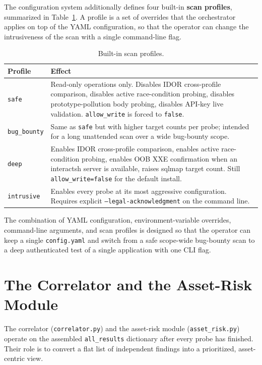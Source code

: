 The configuration system additionally defines four built-in \textbf{scan profiles}, summarized in Table~\ref{tab:profiles}. A profile is a set of overrides that the orchestrator applies on top of the YAML configuration, so that the operator can change the intrusiveness of the scan with a single command-line flag.

\begin{table}[h]
\centering
\small
\begin{tabular}{|l|p{10cm}|}
\hline
\textbf{Profile} & \textbf{Effect} \\
\hline
\texttt{safe}       & Read-only operations only. Disables IDOR cross-profile comparison, disables active race-condition probing, disables prototype-pollution body probing, disables API-key live validation. \texttt{allow\_write} is forced to \texttt{false}. \\
\texttt{bug\_bounty}& Same as \texttt{safe} but with higher target counts per probe; intended for a long unattended scan over a wide bug-bounty scope. \\
\texttt{deep}       & Enables IDOR cross-profile comparison, enables active race-condition probing, enables OOB XXE confirmation when an interactsh server is available, raises sqlmap target count. Still \texttt{allow\_write=false} for the default install. \\
\texttt{intrusive}  & Enables every probe at its most aggressive configuration. Requires explicit \texttt{--legal-acknowledgment} on the command line. \\
\hline
\end{tabular}
\caption{Built-in scan profiles.}
\label{tab:profiles}
\end{table}

The combination of YAML configuration, environment-variable overrides, command-line arguments, and scan profiles is designed so that the operator can keep a single \texttt{config.yaml} and switch from a safe scope-wide bug-bounty scan to a deep authenticated test of a single application with one CLI flag.

\section{The Correlator and the Asset-Risk Module}

The correlator (\texttt{correlator.py}) and the asset-risk module (\texttt{asset\_risk.py}) operate on the assembled \texttt{all\_results} dictionary after every probe has finished. Their role is to convert a flat list of independent findings into a prioritized, asset-centric view.

